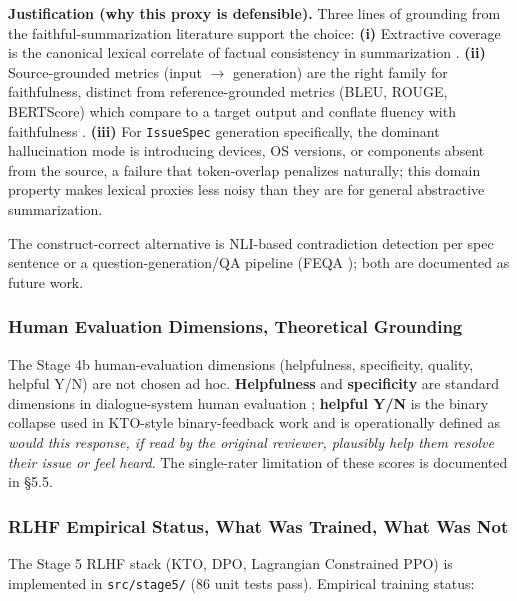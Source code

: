\documentclass[sigconf, nonacm, anonymous, balance=false]{acmart}
\begin{document}
\textbf{Justification (why this proxy is defensible).} Three lines of grounding from the faithful-summarization literature support the choice:
\textbf{(i)} Extractive coverage \cite{grusky2018newsroom} is the canonical lexical correlate of factual consistency in summarization \cite{maynez2020faithfulness, kryscinski2020factcc}.
\textbf{(ii)} Source-grounded metrics (input $\to$ generation) are the right family for faithfulness, distinct from reference-grounded metrics (BLEU, ROUGE, BERTScore) which compare to a target output and conflate fluency with faithfulness \cite{kryscinski2020factcc, fabbri2021summeval, sai2022survey}.
\textbf{(iii)} For \texttt{IssueSpec} generation specifically, the dominant hallucination mode is introducing devices, OS versions, or components absent from the source, a failure that token-overlap penalizes naturally; this domain property makes lexical proxies less noisy than they are for general abstractive summarization.

The construct-correct alternative is NLI-based contradiction detection per spec sentence \cite{laban2022summac, kryscinski2020factcc, honovich2022true} or a question-generation/QA pipeline (FEQA \cite{durmus2020feqa}); both are documented as future work.

\subsubsection{Human Evaluation Dimensions, Theoretical Grounding}\label{human-evaluation-dimensions-theoretical-grounding}

The Stage 4b human-evaluation dimensions (helpfulness, specificity, quality, helpful Y/N) are not chosen ad hoc. \textbf{Helpfulness} and \textbf{specificity} are standard dimensions in dialogue-system human evaluation \cite{liu2016how, sai2022survey}; \textbf{helpful Y/N} is the binary collapse used in KTO-style binary-feedback work \cite{ethayarajh2024} and is operationally defined as \emph{would this response, if read by the original reviewer, plausibly help them resolve their issue or feel heard}. The single-rater limitation of these scores is documented in \S5.5.

\subsubsection{RLHF Empirical Status, What Was Trained, What Was Not}\label{rlhf-empirical-status-what-was-trained-what-was-not}

The Stage 5 RLHF stack (KTO, DPO, Lagrangian Constrained PPO) is implemented in \texttt{src/stage5/} (86 unit tests pass). Empirical training status:
\end{document}
